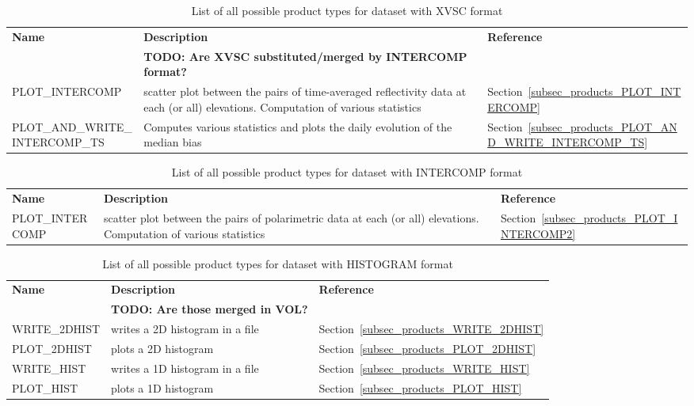 \documentclass[a4paper,11pt,pdftex,twoside]{scrartcl}
\renewcommand{\bf}{\normalfont \bfseries}
\begin{document}
{{{\begin{table}[H]
\begin{tabularx}{\textwidth}{lXl}
{\bf Name} & {\bf Description} & {\bf Reference}\\
& {\bf TODO: Are XVSC substituted/merged by INTERCOMP format?} & \\
PLOT\_INTERCOMP & scatter plot between the pairs of time-averaged reflectivity data at each (or all) elevations. Computation of various statistics & Section~\ref{subsec_products_PLOT_INTERCOMP}\\
PLOT\_AND\_WRITE\_INTERCOMP\_TS   & Computes various statistics and plots the daily evolution of the median bias & Section~\ref{subsec_products_PLOT_AND_WRITE_INTERCOMP_TS}\\
\end{tabularx}
\caption{List of all possible product types for dataset with XVSC format}
\label{tab_products_XVSC}
\end{table}

\begin{table}[H]
\begin{tabularx}{\textwidth}{lXl}
{\bf Name} & {\bf Description} & {\bf Reference}\\
PLOT\_INTERCOMP & scatter plot between the pairs of polarimetric data at each (or all) elevations. Computation of various statistics & Section~\ref{subsec_products_PLOT_INTERCOMP2}\\
\end{tabularx}
\caption{List of all possible product types for dataset with INTERCOMP format}
\label{tab_products_INTERCOMP}
\end{table}

\begin{table}[H]
\begin{tabularx}{\textwidth}{lXl}
{\bf Name} & {\bf Description} & {\bf Reference}\\
& {\bf TODO: Are those merged in VOL?} & \\

WRITE\_2DHIST & writes a 2D histogram in a file & Section~\ref{subsec_products_WRITE_2DHIST}\\
PLOT\_2DHIST & plots a 2D histogram & Section~\ref{subsec_products_PLOT_2DHIST}\\
WRITE\_HIST & writes a 1D histogram in a file & Section~\ref{subsec_products_WRITE_HIST}\\
PLOT\_HIST & plots a 1D histogram & Section~\ref{subsec_products_PLOT_HIST}\\
\end{tabularx}
\caption{List of all possible product types for dataset with HISTOGRAM format}
\label{tab_products_HISTOGRAM}
\end{table}

}}}
\end{document}
